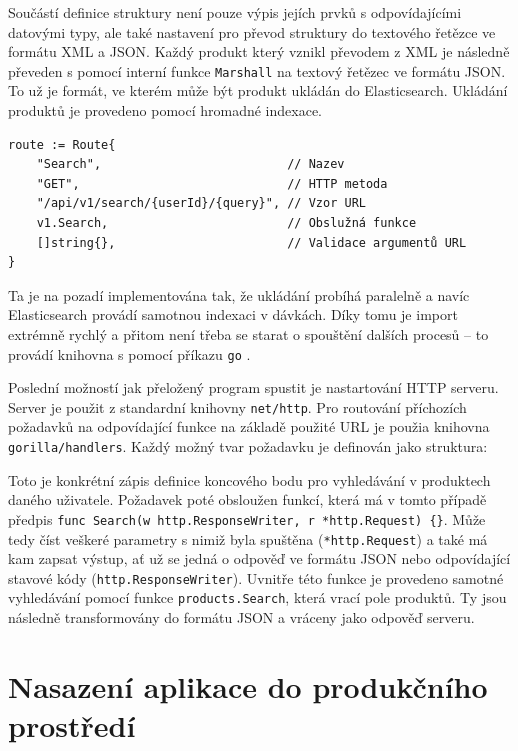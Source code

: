 \documentclass[FM,DP]{tulthesis}
\newenvironment{code}
    {\filbreak\captionsetup{type=listing}}{\filbreak}
\begin{document}
Součástí definice struktury není pouze výpis jejích prvků s odpovídajícími datovými typy, 
ale také nastavení pro převod struktury do textového řetězce ve formátu XML a JSON.
Každý produkt který vznikl převodem z XML je následně převeden s pomocí interní funkce \verb|Marshall|
na textový řetězec ve formátu JSON. To už je formát, ve kterém může být produkt ukládán do
Elasticsearch. Ukládání produktů je provedeno pomocí hromadné indexace.

\begin{code}
\captionsetup{singlelinecheck=false,justification=raggedright}
\label{code:go-routing}
\begin{verbatim}
route := Route{
    "Search",                          // Nazev
    "GET",                             // HTTP metoda
    "/api/v1/search/{userId}/{query}", // Vzor URL
    v1.Search,                         // Obslužná funkce
    []string{},                        // Validace argumentů URL
}
\end{verbatim}
\end{code}

Ta je na pozadí implementována tak, že ukládání probíhá paralelně a navíc Elasticsearch 
provádí samotnou indexaci v dávkách. Díky tomu je import extrémně rychlý a přitom 
není třeba se starat o spouštění dalších procesů -- to provádí knihovna s pomocí
příkazu \verb|go| \cite{go-concurrency}.

Poslední možností jak přeložený program spustit je nastartování HTTP serveru. Server
je použit z standardní knihovny \verb|net/http|. Pro routování příchozích požadavků
na odpovídající funkce na základě použité URL je použia knihovna \verb|gorilla/handlers|.
Každý možný tvar požadavku je definován jako struktura:

Toto je konkrétní zápis definice koncového bodu pro vyhledávání v produktech daného uživatele.
Požadavek poté obsloužen funkcí, která má v tomto případě předpis 
\verb|func Search(w http.ResponseWriter, r *http.Request) {}|. Může tedy číst veškeré
parametry s nimiž byla spuštěna (\verb|*http.Request|) a také má kam zapsat
výstup, ať už se jedná o odpověď ve formátu JSON nebo odpovídající stavové kódy 
(\verb|http.ResponseWriter|). Uvnitře této funkce je provedeno samotné vyhledávání
pomocí funkce \verb|products.Search|, která vrací pole produktů. Ty jsou následně transformovány
do formátu JSON a vráceny jako odpověď serveru.

\section{Nasazení aplikace do produkčního prostředí}
\end{document}
